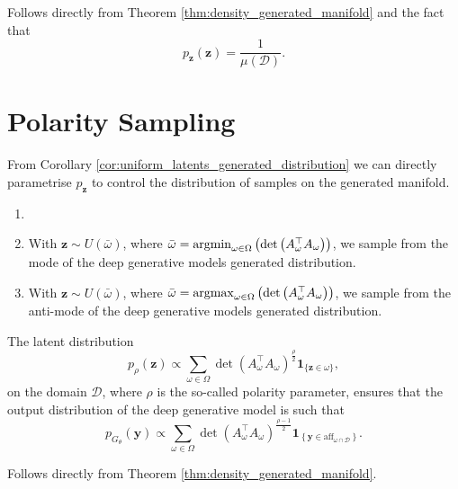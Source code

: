 \begin{tproof}
    Follows directly from Theorem \ref{thm:density_generated_manifold} and the fact that $$p_{\mathbf{z}}(\mathbf{z})=\frac{1}{\mu(\mathcal{D})}.$$
\end{tproof}

\section{Polarity Sampling}\label{sec:polarity_sampling}

From Corollary \ref{cor:uniform_latents_generated_distribution} we can directly parametrise $p_{\mathbf{z}}$ to control the distribution of samples on the generated manifold.

\begin{example}\label{eg:mode_samplings}
    \begin{enumerate}
        \item[]
        \item With $\mathbf{z}\sim U(\bar{\omega})$, where $\bar{\omega}=\operatorname*{\mathrm{argmin}}_{\omega\in\Omega}\left(\det\left(A^\top_{\omega}A_{\omega}\right)\right)$, we sample from the mode of the deep generative models generated distribution.
        \item With $\mathbf{z}\sim U(\bar{\omega})$, where $\bar{\omega}=\operatorname*{\mathrm{argmax}}_{\omega\in\Omega}\left(\det\left(A^\top_{\omega}A_{\omega}\right)\right)$, we sample from the anti-mode of the deep generative models generated distribution.
    \end{enumerate}
\end{example}

\begin{corollary}\label{cor:polarity_sampling}
    The latent distribution $$p_{\rho}(\mathbf{z})\propto\sum_{\omega\in\Omega}\det\left(A_{\omega}^\top A_{\omega}\right)^{\frac{\rho}{2}}\mathbf{1}_{\{\mathbf{z}\in\omega\}},$$on the domain $\mathcal{D}$, where $\rho$ is the so-called polarity parameter, ensures that the output distribution of the deep generative model is such that $$p_{G_{\theta}}(\mathbf{y})\propto\sum_{\omega\in\Omega}\det\left(A_{\omega}^\top A_{\omega}\right)^{\frac{\rho-1}{2}}\mathbf{1}_{\left\{\mathbf{y}\in\mathrm{aff}_{\omega\cap\mathcal{D}}\right\}}.$$
\end{corollary}

\begin{tproof}
    Follows directly from Theorem \ref{thm:density_generated_manifold}.
\end{tproof}

